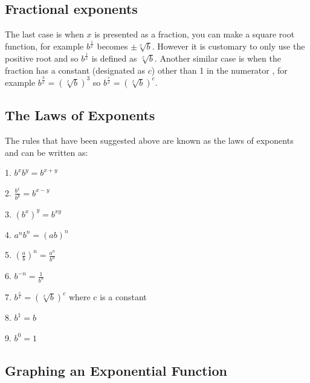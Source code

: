 \subsection{Fractional exponents}
\label{sss:frac-5023}




The last case is when $x$ is presented as a fraction, you can make a square root function,
for example $b^\frac{1}{x}$ becomes $\pm \sqrt[x] b$. However it is customary to only use
the positive root and so $b^\frac{1}{x}$ is defined as $\sqrt[x] b$. Another similar case
is when the fraction has a constant (designated as $c$) other than 1 in the numerator ,
for example $b^ \frac {3}{x} = \left( \sqrt[x] b \right)^3$ so $b^ \frac {c}{x} = \left(
\sqrt[x] b \right)^c$.




\subsection{The Laws of Exponents}
\label{sss:thel-6933}




The rules that have been suggested above are known as the laws of exponents and can be written as:



1.  $b^xb^y = b^{x+y}\,$

2.  $\frac{b^x}{b^y} = b^{x-y}$

3.  $\left(b^x\right)^y = b^{xy}$

4.  $a^n b^n = \left(ab\right)^n\,$

5.  $\left(\frac{a}{b}\right)^n = \frac{a^n}{b^n}$

6.  $b^{-n}=\frac{1}{b^n}$

7.  $b^ \frac {c}{x} = \left( \sqrt[x] b \right)^c$ where c is a constant

8.  $b^1=b\,$

9.  $b^0=1\,$




\subsection{Graphing an Exponential Function}
\label{sss:grap-7e17}




